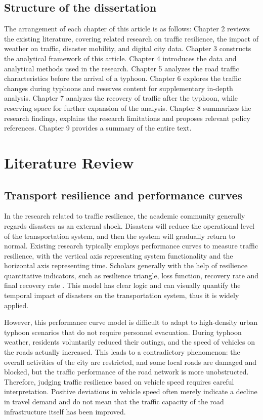 \documentclass[12pt,a4paper]{report}
\begin{document}
\section{Structure of the dissertation}
The arrangement of each chapter of this article is as follows: Chapter 2 reviews the existing literature, covering related research on traffic resilience, the impact of weather on traffic, disaster mobility, and digital city data. Chapter 3 constructs the analytical framework of this article. Chapter 4 introduces the data and analytical methods used in the research. Chapter 5 analyzes the road traffic characteristics before the arrival of a typhoon. Chapter 6 explores the traffic changes during typhoons and reserves content for supplementary in-depth analysis. Chapter 7 analyzes the recovery of traffic after the typhoon, while reserving space for further expansion of the analysis. Chapter 8 summarizes the research findings, explains the research limitations and proposes relevant policy references. Chapter 9 provides a summary of the entire text.

\chapter{Literature Review}

\section{Transport resilience and performance curves}
In the research related to traffic resilience, the academic community generally regards disasters as an external shock. Disasters will reduce the operational level of the transportation system, and then the system will gradually return to normal. Existing research typically employs performance curves to measure traffic resilience, with the vertical axis representing system functionality and the horizontal axis representing time. Scholars generally with the help of resilience quantitative indicators, such as resilience triangle, loss function, recovery rate and final recovery rate \parencite{bruneau2003framework,poulin2021infrastructure}. This model has clear logic and can visually quantify the temporal impact of disasters on the transportation system, thus it is widely applied.

However, this performance curve model is difficult to adapt to high-density urban typhoon scenarios that do not require personnel evacuation. During typhoon weather, residents voluntarily reduced their outings, and the speed of vehicles on the roads actually increased. This leads to a contradictory phenomenon: the overall activities of the city are restricted, and some local roads are damaged and blocked, but the traffic performance of the road network is more unobstructed. Therefore, judging traffic resilience based on vehicle speed requires careful interpretation. Positive deviations in vehicle speed often merely indicate a decline in travel demand and do not mean that the traffic capacity of the road infrastructure itself has been improved.
\end{document}
